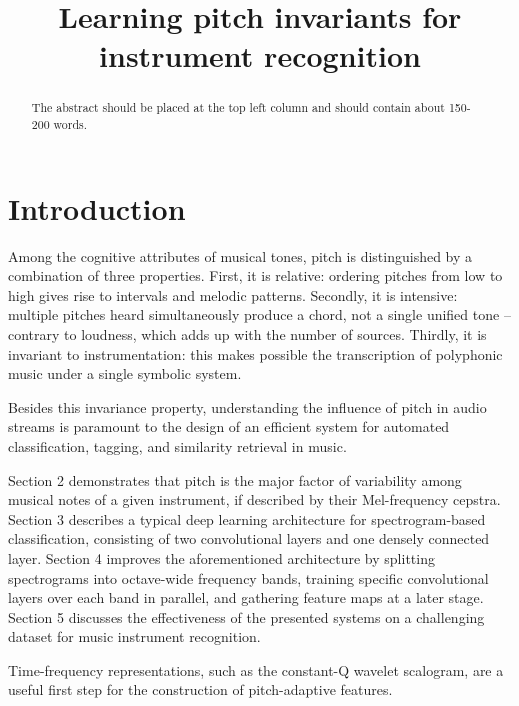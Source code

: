 \documentclass{article}
\title{Learning pitch invariants for instrument recognition}
\begin{document}
%
\maketitle
%
\begin{abstract}
The abstract should be placed at the top left column and should contain about 150-200 words.
\end{abstract}
%

\section{Introduction}\label{sec:introduction}
Among the cognitive attributes of musical tones, pitch is distinguished by a combination of three properties.
First, it is relative: ordering pitches from low to high gives rise to intervals and melodic patterns.
Secondly, it is intensive: multiple pitches heard simultaneously produce a chord, not a single unified tone -- contrary to loudness, which adds up with the number of sources.
Thirdly, it is invariant to instrumentation: this makes possible the transcription of polyphonic music under a single symbolic system. 

Besides this invariance property, understanding the influence of pitch in audio streams is paramount to the design of an efficient system for automated classification, tagging, and similarity retrieval in music. 

Section 2 demonstrates that pitch is the major factor of variability among musical notes of a given instrument, if described by their Mel-frequency cepstra.
Section 3 describes a typical deep learning architecture for spectrogram-based classification, consisting of two convolutional layers and one densely connected layer.
Section 4 improves the aforementioned architecture by splitting spectrograms into octave-wide frequency bands, training specific convolutional layers over each band in parallel, and gathering feature maps at a later stage.
Section 5 discusses the effectiveness of the presented systems on a challenging dataset for music instrument recognition.

Time-frequency representations, such as the constant-Q wavelet scalogram, are a useful first step for the construction of pitch-adaptive features.


\end{document}
